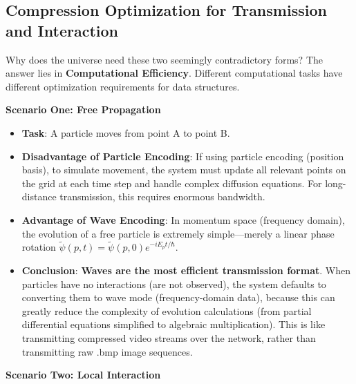 \subsection{Compression Optimization for Transmission and Interaction}

Why does the universe need these two seemingly contradictory forms? The answer lies in \textbf{Computational Efficiency}. Different computational tasks have different optimization requirements for data structures.

\textbf{Scenario One: Free Propagation}

\begin{itemize}
\item \textbf{Task}: A particle moves from point A to point B.

\item \textbf{Disadvantage of Particle Encoding}: If using particle encoding (position basis), to simulate movement, the system must update all relevant points on the grid at each time step and handle complex diffusion equations. For long-distance transmission, this requires enormous bandwidth.

\item \textbf{Advantage of Wave Encoding}: In momentum space (frequency domain), the evolution of a free particle is extremely simple—merely a linear phase rotation $\tilde{\psi}(p, t) = \tilde{\psi}(p, 0) e^{-iE_p t/\hbar}$.

\item \textbf{Conclusion}: \textbf{Waves are the most efficient transmission format}. When particles have no interactions (are not observed), the system defaults to converting them to wave mode (frequency-domain data), because this can greatly reduce the complexity of evolution calculations (from partial differential equations simplified to algebraic multiplication). This is like transmitting compressed video streams over the network, rather than transmitting raw .bmp image sequences.
\end{itemize}

\textbf{Scenario Two: Local Interaction}

